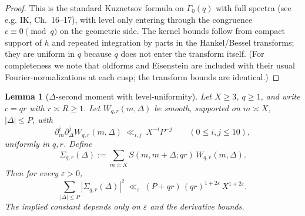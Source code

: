 \documentclass[11pt]{article}
\newtheorem{lemma}{Lemma}[section]
\theoremstyle{definition}
\theoremstyle{remark}
\begin{document}
\begin{proof}
	This is the standard Kuznetsov formula on $\Gamma_0(q)$ with full spectra (see e.g. IK, Ch.~16–17), with level only entering through the congruence $c\equiv0\pmod q$ on the geometric side. The kernel bounds follow from compact support of $h$ and repeated integration by parts in the Hankel/Bessel transforms; they are uniform in $q$ because $q$ does not enter the transform itself. (For completeness we note that oldforms and Eisenstein are included with their usual Fourier-normalizations at each cusp; the transform bounds are identical.)
\end{proof}

\begin{lemma}[$\Delta$-second moment with level-uniformity]\label{lem:delta-second-moment}
	Let $X\ge 3$, $q\ge1$, and write $c=qr$ with $r\asymp R\ge1$. Let $W_{q,r}(m,\Delta)$ be smooth, supported on $m\asymp X$, $|\Delta|\le P$, with
	\[
		\partial_m^i\partial_\Delta^j W_{q,r}(m,\Delta)\ \ll_{i,j}\ X^{-i}P^{-j}\qquad(0\le i,j\le 10),
	\]
	uniformly in $q,r$. Define
	\[
		\Sigma_{q,r}(\Delta):=\sum_{m\asymp X} S(m,m+\Delta;qr)\,W_{q,r}(m,\Delta).
	\]
	Then for every $\varepsilon>0$,
	\[
		\sum_{|\Delta|\le P}\!|\Sigma_{q,r}(\Delta)|^2 \ \ll_{\varepsilon}\ (P+qr)\,(qr)^{1+2\varepsilon}\,X^{1+2\varepsilon}.
	\]
	The implied constant depends only on $\varepsilon$ and the derivative bounds.
\end{lemma}
\end{document}
